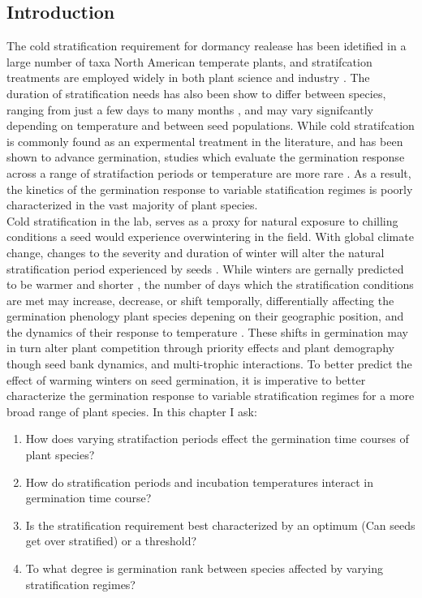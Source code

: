 \documentclass{article}\usepackage[]{graphicx}\usepackage[]{color}
\begin{document}
{\subsection{Introduction}
 The cold stratification requirement for dormancy realease has been idetified in a large number of taxa North American temperate plants, and stratifcation treatments are employed widely in both plant science and industry \citep{Hartmann_2011}. The duration of stratification needs has also been show to differ between species, ranging from just a few days to many months \citep{}, and may vary signifcantly depending on temperature \citep{Steadman2004} and between seed populations. While cold stratifcation is commonly found as an expermental treatment in the literature, and has been shown to advance germination, studies which evaluate the germination response across a range of stratifaction periods or temperature are more rare \citep{Batlla2009}. As a result, the kinetics of the germination response to variable statification regimes is poorly characterized in the vast majority of plant species.\\
\indent Cold stratification in the lab, serves as a proxy for natural exposure to chilling conditions a seed would experience overwintering in the field. With global climate change, changes to the severity and duration of winter will alter the natural stratification period experienced by seeds \citep{Walck2011}. While winters are gernally predicted to be warmer and shorter \citep{IPCC}, the number of days which the stratification conditions are met may increase, decrease, or shift temporally, differentially affecting the germination phenology plant species depening on their geographic position, and the dynamics of their response to temperature \citep{Walck2011}. These shifts in germination may in turn alter plant competition through priority effects \citep{} and plant demography though seed bank dynamics, and multi-trophic interactions.
\indent To better predict the effect of warming winters on seed germination, it is imperative to better characterize the germination response to variable stratification regimes for a more broad range of plant species. In this chapter I ask:
\begin{enumerate}
\item How does varying stratifaction periods effect the germination time courses of plant species?
\item How do stratification periods and incubation temperatures interact in germination time course?
\item Is the stratification requirement best characterized by an optimum (Can seeds get over stratified) or a threshold?
\item To what degree is germination rank between species affected by varying stratification regimes?
\end{enumerate}
}
\end{document}
